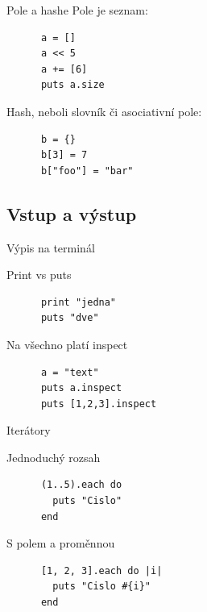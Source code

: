 \documentclass{beamer}
\begin{document}
\begin{frame}[fragile]{Pole a hashe}
  Pole je seznam:
  \begin{block}{}
    {\scriptsize \begin{verbatim}
      a = []
      a << 5
      a += [6]
      puts a.size
    \end{verbatim}}
  \end{block}
  \pause
  Hash, neboli slovník či asociativní pole:
  \begin{block}{}
    {\scriptsize \begin{verbatim}
      b = {}
      b[3] = 7
      b["foo"] = "bar"
    \end{verbatim}}
  \end{block}
\end{frame}

\subsection{Vstup a výstup}

\begin{frame}[fragile]{Výpis na terminál}
  \begin{block}{Print vs puts}
    \begin{verbatim}
      print "jedna"
      puts "dve"
    \end{verbatim}
  \end{block}
  \pause
  \begin{block}{Na všechno platí inspect}
    \begin{verbatim}
      a = "text"
      puts a.inspect
      puts [1,2,3].inspect
    \end{verbatim}
  \end{block}
\end{frame}

\begin{frame}[fragile]{Iterátory}
  \begin{block}{Jednoduchý rozsah}
    \begin{verbatim}
      (1..5).each do
        puts "Cislo"
      end
    \end{verbatim}
  \end{block}
  \pause
  \begin{block}{S polem a proměnnou}
    \begin{verbatim}
      [1, 2, 3].each do |i|
        puts "Cislo #{i}"
      end
    \end{verbatim}
  \end{block}
\end{frame}
\end{document}
